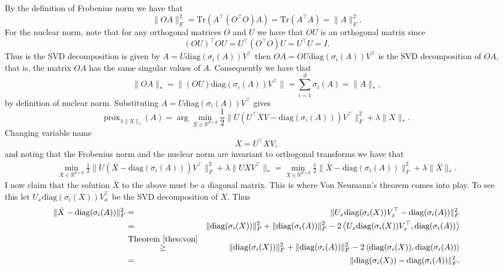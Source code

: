 \documentclass[11pt]{article}
\newcommand{\R}{\mathbb{R}}
\newcommand{\norm}[1]{\lVert#1\rVert}
\newcommand{\dotprod}[1]{\left< #1\right>}
\newcommand{\Tr}[1]{\mbox{Tr}\left( #1\right)}
\begin{document}
\begin{ExerciseList}
       \Answer[ref={Is}] By the definition of Frobenius norm we have that
       \[\norm{OA}_F^2 = \Tr{A^\top (O^\top O) A} = \Tr{A^\top A} = \norm{A}_F^2.\]
       For the nuclear norm, note that for any orthogonal matrices $O$ and $U$ we have that $OU$ is an orthogonal matrix since 
       \[(OU)^\top OU = U^\top (O^\top O) U = U^\top U = I.\]
     Thus  is the SVD decomposition  is given by $A = U \mbox{diag}(\sigma_i(A)) V^\top$ then $OA = OU \mbox{diag}(\sigma_i(A)) V^\top$ is the SVD decomposition of $OA$, that is, the matrix $OA$ has the same singular values of $A$. Consequently we have that
       \[\norm{OA}_* = \norm{(OU) \mbox{diag}(\sigma_i(A)) V^\top}=
       \sum_{i=1}^d \sigma_i(A) = \norm{A}_*,
       \]
      by definition of nuclear norm.
    \Answer[ref={IIs}] 
    Substituting $A=U\mbox{diag}(\sigma_i(A))V^\top$ gives
    \[ \mbox{prox}_{\lambda \norm{X}_*} (A) = \arg\min_{X \in \R^{d\times d}} \frac{1}{2}\norm{U(U^\top XV-\mbox{diag}(\sigma_i(A)))V^\top}_F^2 + \lambda\norm{X}_*. \]
    Changing variable name 
    \begin{equation}\label{eq:XbarX}
    \bar{X} = U^\top XV,
    \end{equation} and noting that the Frobenius norm and the nuclear norm are invariant to orthogonal transforms we have that
 \begin{eqnarray}
\min_{X \in \R^{d\times d}} \frac{1}{2}\norm{U(\bar{X}-\mbox{diag}(\sigma_i(A)))V^\top}_F^2 + \lambda\norm{U\bar{X}V^\top}_* 
   = \min_{X \in \R^{d\times d}} \frac{1}{2}\norm{\bar{X}-\mbox{diag}(\sigma_i(A))}_F^2 + \lambda\norm{\bar{X}}_*.\label{eq:aniohnq88h}
\end{eqnarray}  
I now claim that  the solution $\bar{X}$ to the above must be a diagonal matrix. This is where Von Neumann's theorem comes into play. To see this let $U_x \mbox{diag}(\sigma_i(X))V_x^\top$ be the SVD decomposition of $X$. Thus
\begin{eqnarray*}
 \norm{\bar{X}-\mbox{diag}(\sigma_i(A))}_F^2 &=&
\norm{U_x \mbox{diag}(\sigma_i(X))V_x^\top-\mbox{diag}(\sigma_i(A))}_F^2 \\
& = & \norm{\mbox{diag}(\sigma_i(X))}_F^2 + \norm{\mbox{diag}(\sigma_i(A))}_F^2 -
2\dotprod{U_x \mbox{diag}(\sigma_i(X))V_x^\top, \mbox{diag}(\sigma_i(A))}\\
& \overset{\mbox{Theorem}~\ref{theo:von}}{\geq} &\norm{\mbox{diag}(\sigma_i(X))}_F^2 + \norm{\mbox{diag}(\sigma_i(A))}_F^2 -2 \dotprod{ \mbox{diag}(\sigma_i(X)), \mbox{diag}(\sigma_i(A))} \\
& =& \norm{\mbox{diag}(\sigma_i(X)) - \mbox{diag}(\sigma_i(A))}_F^2.

\end{eqnarray*}
\end{ExerciseList}
\end{document}
